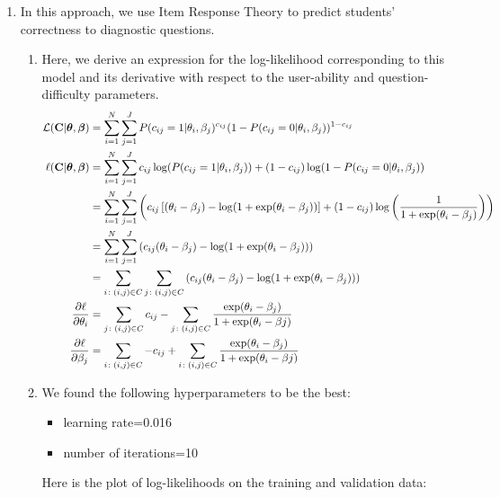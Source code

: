 \documentclass{article}
\newcommand{\bs}{\boldsymbol}
\newcommand{\mbf}[1]{\mathbf{#1}}
\newcommand{\mc}[1]{\mathcal{#1}}
\begin{document}
\begin{enumerate}[label=\arabic*.]
    \item In this approach, we use Item Response Theory to predict students' correctness to diagnostic questions.
        \begin{enumerate}[label=(\alph*)]
            \item Here, we derive an expression for the log-likelihood corresponding to this model and its derivative with respect to the user-ability and question-difficulty parameters. 
                \begin{align*}
                    \mc L(\mbf C|\bs\theta,\bs\beta) &= \sum_{i=1}^{N}{\sum_{j=1}^{J}{P(c_{ij}=1|\theta_i,\beta_j)^{c_{ij}}(1-P(c_{ij}=0|\theta_i,\beta_j))^{1-c_{ij}}}} \\
                    \ell(\mbf C|\bs\theta, \bs\beta) &= \sum_{i=1}^{N}{\sum_{j=1}^{J}{c_{ij}\log(P(c_{ij}=1|\theta_i,\beta_j))+(1-c_{ij})\log(1-P(c_{ij}=0|\theta_i,\beta_j))}} \\
                                                     &= \sum_{i=1}^{N}{\sum_{j=1}^{J}{\left(c_{ij}\left[(\theta_i-\beta_j)-\log(1+\exp(\theta_i-\beta_j))\right]+(1-c_{ij})\log \left(\frac{1}{1+\exp(\theta_i-\beta_j)}\right)\right)}} \\
                                                     &= \sum_{i=1}^{N}{\sum_{j=1}^{J}{\left(c_{ij}(\theta_i-\beta_j)-\log(1+\exp(\theta_i-\beta_j))\right)}} \\
                                                     &= \sum_{i\colon (i, j)\in C}{\sum_{j\colon (i, j)\in C}{\left(c_{ij}(\theta_i-\beta_j)-\log(1+\exp(\theta_i-\beta_j))\right)}} \\
                    \pdv{\ell}{\theta_i} &= \sum_{j\colon (i, j)\in C}{c_{ij}}-\sum_{j\colon (i, j)\in C}{\frac{\exp(\theta_i-\beta_j)}{1+\exp(\theta_i-\beta j)}} \\
                    \pdv{\ell}{\beta_j} &= \sum_{i\colon (i, j)\in C}{-c_{ij}} + \sum_{i\colon (i, j)\in C}{\frac{\exp(\theta_i-\beta_j)}{1+\exp(\theta_i-\beta j)}}
                \end{align*}
            \item We found the following hyperparameters to be the best:
                \begin{itemize}
                    \item learning rate=0.016
                    \item number of iterations=10 
                \end{itemize}
                Here is the plot of log-likelihoods on the training and validation data:

\end{enumerate}
\end{enumerate}
\end{document}
